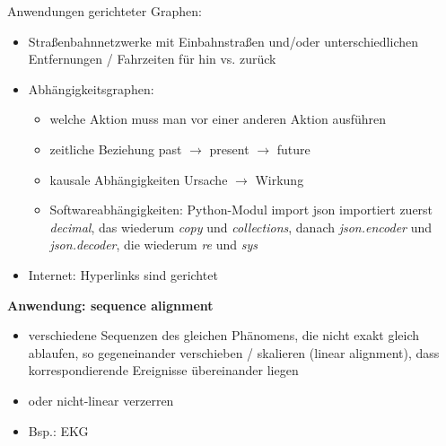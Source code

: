    Anwendungen gerichteter Graphen:
    \begin{itemize}
        \item Straßenbahnnetzwerke mit Einbahnstraßen und/oder unterschiedlichen Entfernungen / Fahrzeiten für hin vs. zurück
        \item Abhängigkeitsgraphen:
        \begin{itemize}
            \item welche Aktion muss man vor einer anderen Aktion ausführen
            \item zeitliche Beziehung \hspace*{1cm}past $\rightarrow$ present $\rightarrow$ future
            \item kausale Abhängigkeiten \hspace*{0.1cm} Ursache $\rightarrow$ Wirkung
            \item Softwareabhängigkeiten: Python-Modul import json importiert zuerst \emph{decimal}, das wiederum \emph{copy} und \emph{collections}, danach \emph{json.encoder} und \emph{json.decoder}, die wiederum \emph{re} und \emph{sys}
        \end{itemize}
        \item Internet: Hyperlinks sind gerichtet
    \end{itemize}

    \textbf{Anwendung: sequence alignment}
    \begin{itemize}
        \item verschiedene Sequenzen des gleichen Phänomens, die nicht exakt gleich ablaufen, so gegeneinander verschieben / skalieren (linear alignment), dass korrespondierende Ereignisse übereinander liegen
        \item oder nicht-linear verzerren
        \item Bsp.: EKG
    \end{itemize}

